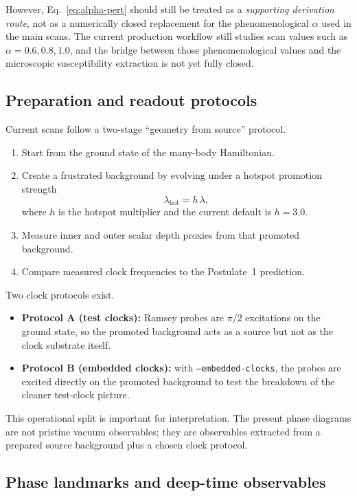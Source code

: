 \documentclass[11pt]{article}
\begin{document}
However, Eq.~\eqref{eq:alpha-pert} should still be treated as a \emph{supporting derivation route}, not as a numerically closed replacement for the phenomenological $\alpha$ used in the main scans. The current production workflow still studies scan values such as $\alpha=0.6,0.8,1.0$, and the bridge between those phenomenological values and the microscopic susceptibility extraction is not yet fully closed.

\subsection{Preparation and readout protocols}

Current scans follow a two-stage ``geometry from source'' protocol.

\begin{enumerate}
    \item Start from the ground state of the many-body Hamiltonian.
    \item Create a frustrated background by evolving under a hotspot promotion strength
    \[
    \lambda_{\mathrm{hot}} = h\,\lambda,
    \]
    where $h$ is the hotspot multiplier and the current default is $h=3.0$.
    \item Measure inner and outer scalar depth proxies from that promoted background.
    \item Compare measured clock frequencies to the Postulate~1 prediction.
\end{enumerate}

Two clock protocols exist.

\begin{itemize}
    \item \textbf{Protocol A (test clocks):} Ramsey probes are $\pi/2$ excitations on the ground state, so the promoted background acts as a source but not as the clock substrate itself.
    \item \textbf{Protocol B (embedded clocks):} with \texttt{--embedded-clocks}, the probes are excited directly on the promoted background to test the breakdown of the cleaner test-clock picture.
\end{itemize}

This operational split is important for interpretation. The present phase diagrams are not pristine vacuum observables; they are observables extracted from a prepared source background plus a chosen clock protocol.

\subsection{Phase landmarks and deep-time observables}
\end{document}

